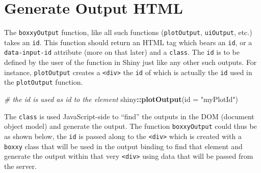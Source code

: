 \documentclass[10pt,]{krantz}
\makeatletter
\newenvironment{Shaded}{\begin{snugshade}}{\end{snugshade}}
\newcommand{\CommentTok}[1]{\textcolor[rgb]{0.37,0.37,0.37}{\textit{#1}}}
\newcommand{\ControlFlowTok}[1]{\textcolor[rgb]{0.27,0.27,0.27}{\textbf{#1}}}
\newcommand{\DataTypeTok}[1]{\textcolor[rgb]{0.27,0.27,0.27}{#1}}
\newcommand{\KeywordTok}[1]{\textcolor[rgb]{0.27,0.27,0.27}{\textbf{#1}}}
\newcommand{\NormalTok}[1]{#1}
\newcommand{\OperatorTok}[1]{\textcolor[rgb]{0.43,0.43,0.43}{\textbf{#1}}}
\newcommand{\OtherTok}[1]{\textcolor[rgb]{0.37,0.37,0.37}{#1}}
\newcommand{\StringTok}[1]{\textcolor[rgb]{0.5,0.5,0.5}{#1}}
\newenvironment{kframe}{%
\medskip{}
\setlength{\fboxsep}{.8em}
 \def\at@end@of@kframe{}%
 \ifinner\ifhmode%
  \def\at@end@of@kframe{\end{minipage}}%
  \begin{minipage}{\columnwidth}%
 \fi\fi%
 \def\FrameCommand##1{\hskip\@totalleftmargin \hskip-\fboxsep
 \colorbox{shadecolor}{##1}\hskip-\fboxsep
     \hskip-\linewidth \hskip-\@totalleftmargin \hskip\columnwidth}%
 \MakeFramed {\advance\hsize-\width
   \@totalleftmargin\z@ \linewidth\hsize
   \@setminipage}}%
 {\par\unskip\endMakeFramed%
 \at@end@of@kframe}
\renewenvironment{Shaded}{\begin{kframe}}{\end{kframe}}
\makeatother
\begin{document}
\hypertarget{shiny-output-html}{%
\section{Generate Output HTML}\label{shiny-output-html}}

The \texttt{boxxyOutput} function, like all such functions (\texttt{plotOutput}, \texttt{uiOutput}, etc.) takes an \texttt{id}. This function should return an HTML tag which bears an \texttt{id}, or a \texttt{data-input-id} attribute (more on that later) and a \texttt{class}. The \texttt{id} is to be defined by the user of the function in Shiny just like any other such outputs. For instance, \texttt{plotOutput} creates a \texttt{\textless{}div\textgreater{}} the \texttt{id} of which is actually the \texttt{id} used in the \texttt{plotOutput} function.

\begin{Shaded}
\begin{Highlighting}[]
\CommentTok{# the id is used as id to the element}
\NormalTok{shiny}\OperatorTok{::}\KeywordTok{plotOutput}\NormalTok{(}\DataTypeTok{id =} \StringTok{"myPlotId"}\NormalTok{)}
\end{Highlighting}
\end{Shaded}

\begin{Shaded}
\end{Shaded}

The \texttt{class} is used JavaScript-side to ``find'' the outputs in the DOM (document object model) and generate the output. The function \texttt{boxxyOutput} could thus be as shown below, the \texttt{id} is passed along to the \texttt{\textless{}div\textgreater{}} which is created with a \texttt{boxxy} class that will be used in the output binding to find that element and generate the output within that very \texttt{\textless{}div\textgreater{}} using data that will be passed from the server.

\begin{Shaded}
\end{Shaded}
\end{document}
